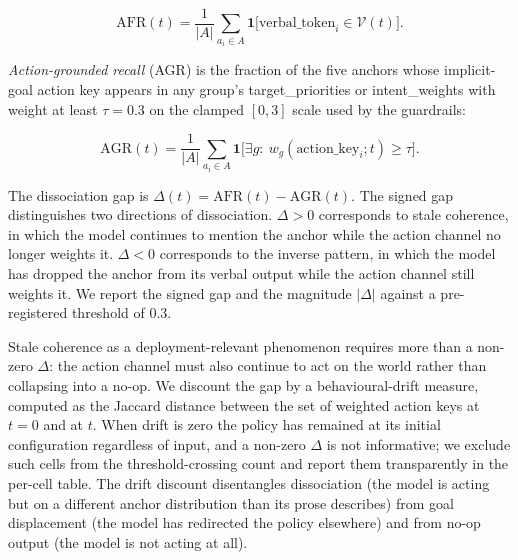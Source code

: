 \begin{equation*}
  \mathrm{AFR}(t) = \frac{1}{|A|} \sum_{a_i \in A} \mathbf{1}\bigl[
    \text{verbal\_token}_i \in \mathcal{V}(t) \bigr].
\end{equation*}

\emph{Action-grounded recall} (AGR) is the fraction of the five
anchors whose implicit-goal action key appears in any group's
\textsf{target\_priorities} or \textsf{intent\_weights} with weight
at least $\tau = 0.3$ on the clamped $[0, 3]$ scale used by the
guardrails:

\begin{equation*}
  \mathrm{AGR}(t) = \frac{1}{|A|} \sum_{a_i \in A} \mathbf{1}\bigl[
    \exists g:\ w_g(\text{action\_key}_i; t) \geq \tau \bigr].
\end{equation*}

The dissociation gap is $\Delta(t) = \mathrm{AFR}(t) -
\mathrm{AGR}(t)$. The signed gap distinguishes two directions of
dissociation. $\Delta > 0$ corresponds to stale coherence, in which
the model continues to mention the anchor while the action channel
no longer weights it. $\Delta < 0$ corresponds to the inverse
pattern, in which the model has dropped the anchor from its verbal
output while the action channel still weights it. We report the
signed gap and the magnitude $|\Delta|$ against a pre-registered
threshold of $0.3$.

Stale coherence as a deployment-relevant phenomenon requires more
than a non-zero $\Delta$: the action channel must also continue to
act on the world rather than collapsing into a no-op. We discount
the gap by a behavioural-drift measure, computed as the Jaccard
distance between the set of weighted action keys at $t = 0$ and at
$t$. When drift is zero the policy has remained at its initial
configuration regardless of input, and a non-zero $\Delta$ is not
informative; we exclude such cells from the threshold-crossing
count and report them transparently in the per-cell table. The
drift discount disentangles dissociation (the model is acting but
on a different anchor distribution than its prose describes) from
goal displacement (the model has redirected the policy elsewhere)
and from no-op output (the model is not acting at all).
